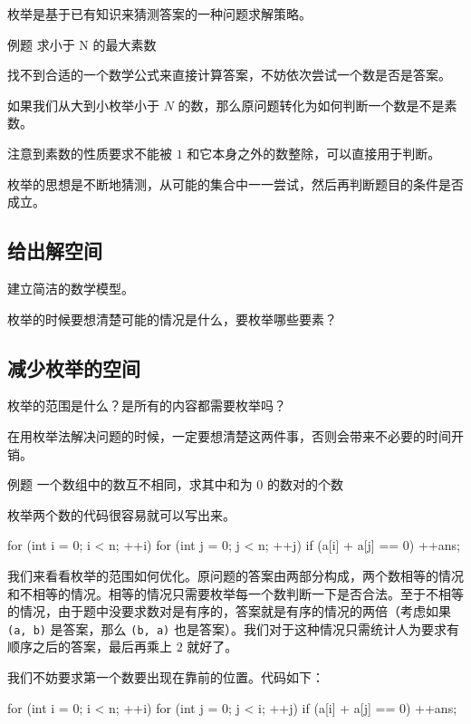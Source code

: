
枚举是基于已有知识来猜测答案的一种问题求解策略。

\begin{NOTE}{例题}{}
求小于 N 的最大素数
\end{NOTE}


找不到合适的一个数学公式来直接计算答案，不妨依次尝试一个数是否是答案。

如果我们从大到小枚举小于 $N$ 的数，那么原问题转化为如何判断一个数是不是素数。

注意到素数的性质要求不能被 $1$ 和它本身之外的数整除，可以直接用于判断。

枚举的思想是不断地猜测，从可能的集合中一一尝试，然后再判断题目的条件是否成立。

\subsection{给出解空间}

建立简洁的数学模型。

枚举的时候要想清楚可能的情况是什么，要枚举哪些要素？

\subsection{减少枚举的空间}

枚举的范围是什么？是所有的内容都需要枚举吗？

在用枚举法解决问题的时候，一定要想清楚这两件事，否则会带来不必要的时间开销。

\begin{NOTE}{例题}{}
一个数组中的数互不相同，求其中和为 $0$ 的数对的个数

\end{NOTE}


枚举两个数的代码很容易就可以写出来。

\begin{cppcode}
for (int i = 0; i < n; ++i)
  for (int j = 0; j < n; ++j)
    if (a[i] + a[j] == 0) ++ans;
\end{cppcode}

我们来看看枚举的范围如何优化。原问题的答案由两部分构成，两个数相等的情况和不相等的情况。相等的情况只需要枚举每一个数判断一下是否合法。至于不相等的情况，由于题中没要求数对是有序的，答案就是有序的情况的两倍（考虑如果 \texttt{(a, b)} 是答案，那么 \texttt{(b, a)} 也是答案）。我们对于这种情况只需统计人为要求有顺序之后的答案，最后再乘上 $2$ 就好了。

我们不妨要求第一个数要出现在靠前的位置。代码如下：

\begin{cppcode}
for (int i = 0; i < n; ++i)
  for (int j = 0; j < i; ++j)
    if (a[i] + a[j] == 0) ++ans;
\end{cppcode}

